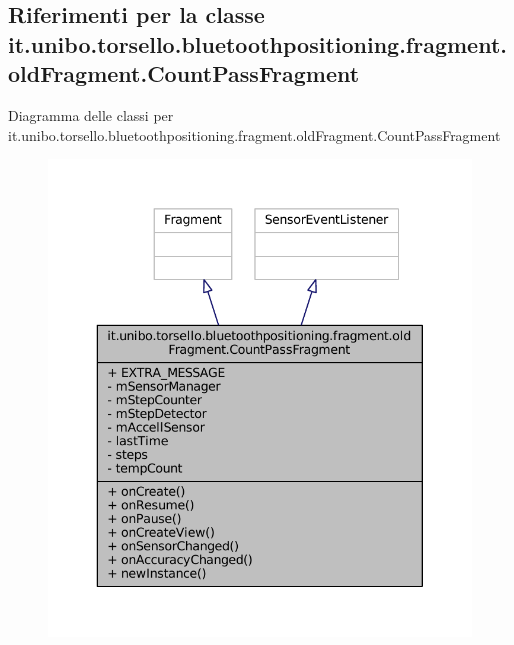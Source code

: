\hypertarget{classit_1_1unibo_1_1torsello_1_1bluetoothpositioning_1_1fragment_1_1oldFragment_1_1CountPassFragment}{}\subsection{Riferimenti per la classe it.\+unibo.\+torsello.\+bluetoothpositioning.\+fragment.\+old\+Fragment.\+Count\+Pass\+Fragment}
\label{classit_1_1unibo_1_1torsello_1_1bluetoothpositioning_1_1fragment_1_1oldFragment_1_1CountPassFragment}


Diagramma delle classi per it.\+unibo.\+torsello.\+bluetoothpositioning.\+fragment.\+old\+Fragment.\+Count\+Pass\+Fragment
\nopagebreak
\begin{figure}[H]
\begin{center}
\leavevmode
\includegraphics[width=343pt]{classit_1_1unibo_1_1torsello_1_1bluetoothpositioning_1_1fragment_1_1oldFragment_1_1CountPassFragment__inherit__graph}
\end{center}
\end{figure}


